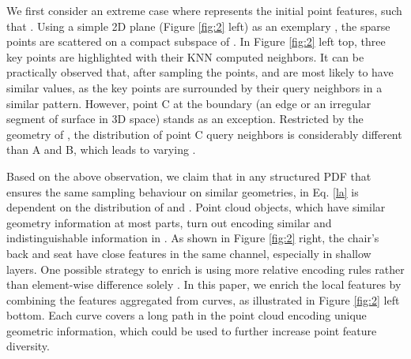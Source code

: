 \documentclass[10pt,twocolumn,letterpaper]{article}
\theoremstyle{definition}
\begin{document}
We first consider an extreme case where  represents the initial point features, such that . Using a simple 2D plane (Figure \ref{fig:2} left) as an exemplary , the sparse points are scattered on a compact subspace of . In Figure \ref{fig:2} left top, three key points are highlighted with their KNN computed neighbors. It can be practically observed that, after sampling the points,  and  are most likely to have similar values, as the key points are surrounded by their query neighbors in a similar pattern. However, point C at the boundary (an edge or an irregular segment of surface in 3D space) stands as an exception. Restricted by the geometry of , the distribution of point C query neighbors is considerably different than A and B, which leads to varying . 

Based on the above observation, we claim that in any structured PDF that ensures the same sampling behaviour on similar geometries,  in Eq. \ref{la} is dependent on the distribution of  and . Point cloud objects, which have similar geometry information at most parts, turn out encoding similar and indistinguishable information in . As shown in Figure \ref{fig:2} right, the chair's back and seat have close features in the same channel, especially in shallow layers. One possible strategy to enrich  is using more relative encoding rules rather than element-wise difference solely \cite{hu2020randla, bytyqi2020local}. In this paper, we enrich the local features  by combining the features aggregated from curves, as illustrated in Figure \ref{fig:2} left bottom. Each curve covers a long path in the point cloud encoding unique geometric information, which could be used to further increase point feature diversity. 
\end{document}
